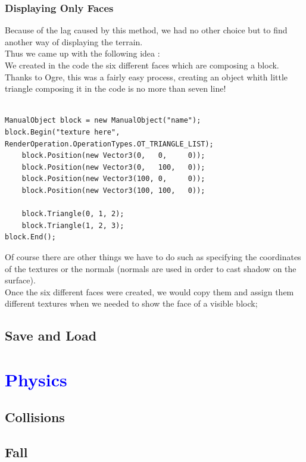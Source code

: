 \documentclass[article]{report}         %
\begin{document}
        \subsection{Displaying Only Faces}
          Because of the lag caused by this method, we had no other choice but to find another way of displaying the terrain.\\
          Thus we came up with the following idea :\\
          We created in the code the six different faces which are composing a block.\\
          Thanks to Ogre, this was a fairly easy process, creating an object whith little triangle composing it in the code is no more than seven line!
          \begin{lstlisting}

ManualObject block = new ManualObject("name");
block.Begin("texture here", RenderOperation.OperationTypes.OT_TRIANGLE_LIST);
    block.Position(new Vector3(0,   0,     0));
    block.Position(new Vector3(0,   100,   0));
    block.Position(new Vector3(100, 0,     0));
    block.Position(new Vector3(100, 100,   0));

    block.Triangle(0, 1, 2);
    block.Triangle(1, 2, 3);
block.End();
        \end{lstlisting}

        Of course there are other things we have to do such as specifying the coordinates of the textures or the normals (normals are used in order to cast shadow on the surface).\\
 
        Once the six different faces were created, we would copy them and assign them different textures when we needed to show the face of a visible block;

      \section{Save and Load}
    \chapter{\textcolor{blue}{Physics}}
      \section{Collisions} %
      \section{Fall}
\end{document}
